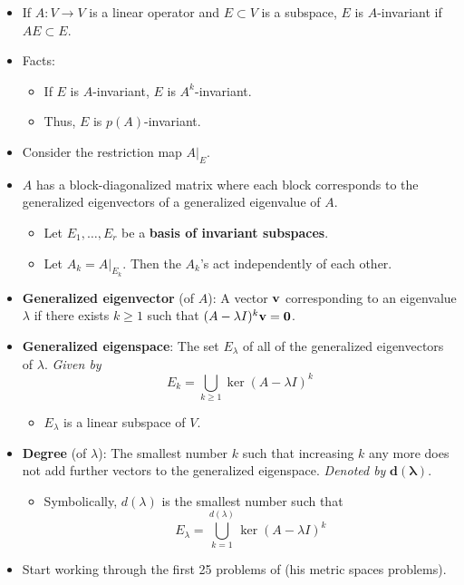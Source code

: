 \documentclass[../../notes.tex]{subfiles}
\begin{document}
\begin{itemize}
    \item If $A:V\to V$ is a linear operator and $E\subset V$ is a subspace, $E$ is $A$-invariant if $AE\subset E$.
    \item Facts:
    \begin{itemize}
        \item If $E$ is $A$-invariant, $E$ is $A^k$-invariant.
        \item Thus, $E$ is $p(A)$-invariant.
    \end{itemize}
    \item Consider the restriction map $A|_E$.
    \item $A$ has a block-diagonalized matrix where each block corresponds to the generalized eigenvectors of a generalized eigenvalue of $A$.
    \begin{itemize}
        \item Let $E_1,\dots,E_r$ be a \textbf{basis of invariant subspaces}.
        \item Let $A_k=A|_{E_k}$. Then the $A_k$'s act independently of each other.
    \end{itemize}
    \item \textbf{Generalized eigenvector} (of $A$): A vector $\mathbf{v}$ corresponding to an eigenvalue $\lambda$ if there exists $k\geq 1$ such that $(A-\lambda I)^k\mathbf{v}=\bm{0}$.
    \item \textbf{Generalized eigenspace}: The set $E_\lambda$ of all of the generalized eigenvectors of $\lambda$. \emph{Given by}
    \begin{equation*}
        E_k = \bigcup_{k\geq 1}\ker(A-\lambda I)^k
    \end{equation*}
    \begin{itemize}
        \item $E_\lambda$ is a linear subspace of $V$.
    \end{itemize}
    \item \textbf{Degree} (of $\lambda$): The smallest number $k$ such that increasing $k$ any more does not add further vectors to the generalized eigenspace. \emph{Denoted by} $\bm{d(\lambda)}$.
    \begin{itemize}
        \item Symbolically, $d(\lambda)$ is the smallest number such that
        \begin{equation*}
            E_\lambda = \bigcup_{k=1}^{d(\lambda)}\ker(A-\lambda I)^k
        \end{equation*}
    \end{itemize}
    \item Start working through the first 25 problems of \textcite{bib:Rudin} (his metric spaces problems).

\end{itemize}
\end{document}
